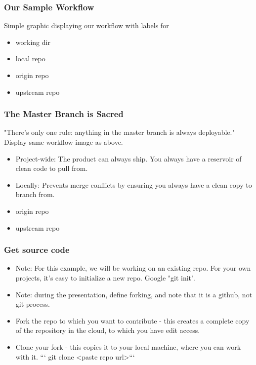 \documentclass[unknownkeysallowed]{beamer}
\begin{document}
\begin{frame}
    \frametitle{Our Sample Workflow}
    Simple graphic displaying our workflow with labels for
    \begin{itemize}
        \item{working dir}
        \item{local repo}
        \item{origin repo}
        \item{upstream repo}
    \end{itemize}
    \vspace{1cm} %
\end{frame}

\begin{frame}
    \frametitle{The Master Branch is Sacred}
    "There's only one rule: anything in the master branch is always deployable."
    Display same workflow image as above.
    \begin{itemize}
        \item{Project-wide: The product can always ship. You always have a reservoir of clean code to pull from.}
        \item{Locally: Prevents merge conflicts by ensuring you always have a clean copy to branch from.}
        \item{origin repo}
        \item{upstream repo}
    \end{itemize}
    \vspace{1cm} %
\end{frame}

\begin{frame}
    \frametitle{Get source code}
    \begin{itemize}
        \item{Note: For this example, we will be working on an existing repo. For your own projects, it's easy to initialize a new repo. Google "git init".}
        \item{Note: during the presentation, define forking, and note that it is a github, not git process.}
        \item{Fork the repo to which you want to contribute - this creates a complete copy of the repository in the cloud, to which you have edit access.}
        \item{Clone your fork - this copies it to your local machine, where you can work with it.  ``` git clone <paste repo url>```}
    \end{itemize}
    \vspace{1cm} %
\end{frame}
\end{document}
